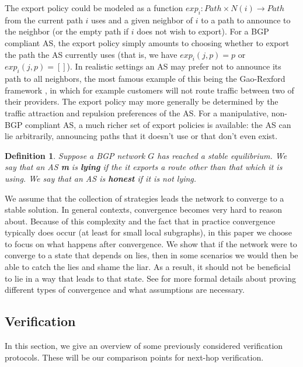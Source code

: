 \documentclass[pdftex,twoside,twocolumn,10pt,letterpaper]{article}
\newtheorem{definition}{Definition}
\begin{document}
    The export policy could be modeled as a function
    $exp_i : Path\times N(i) \to Path$ from the current path $i$ uses and a
    given neighbor of $i$ to a path to announce to the neighbor (or the empty
    path if $i$ does not wish to export).
    For a BGP compliant AS, the export policy simply amounts to choosing whether
    to export the path the AS currently uses (that is, we have $exp_i(j, p) = p$ or
    $exp_i(j, p) = []$).
    In realistic settings an AS may prefer not to announce its path to all
    neighbors, the most famous example of this being the Gao-Rexford framework
    \cite{GaoRexford}, in which for example customers will not route traffic
    between two of their providers.
    The export policy may more generally be determined by the traffic attraction
    and repulsion preferences of the AS.
    For a manipulative, non-BGP compliant AS,
    a much richer set of export policies is available:
    the AS can lie arbitrarily, announcing paths that it doesn't use
    or that don't even exist.

    \begin{definition}
      Suppose a BGP network $G$ has reached a stable equilibrium.
      We say that an AS \textbf{m} is \textbf{lying} if the
      it exports a route other than that which it is using.
      We say that an AS is \textbf{honest} if it is not lying.
    \end{definition}

    We assume that the collection of strategies leads the network to converge to a
    stable solution.
    In general contexts, convergence becomes very hard to
    reason about. Because of this complexity and the fact that in practice
    convergence typically does occur (at least for small local subgraphs),
    in this paper we choose to focus on what happens after
    convergence. We show that if the network were to converge to a state that
    depends on lies, then in some scenarios
    we would then be able to catch the lies and shame the liar.
    As a result, it should not be beneficial to lie in a way that leads to that
    state.
    See \cite{RoutingGames, GaoRexford, StablePaths, PolicyPathVector}
    for more formal details about proving different types of convergence
    and what assumptions are necessary.


  \subsection{Verification}
    In this section, we give an overview of some previously considered 
    verification protocols. These will be our comparison points for next-hop
    verification.
\end{document}

